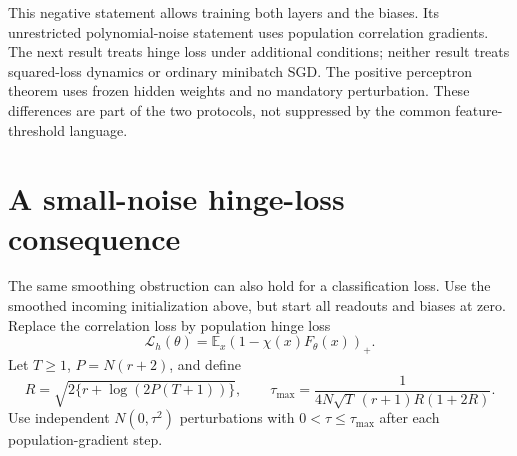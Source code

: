 \documentclass[11pt]{article}
\newcommand{\E}{\mathbb E}\newcommand{\R}{\mathbb R}
\begin{document}
This negative statement allows training both layers and the biases.
Its unrestricted polynomial-noise statement uses population correlation
gradients. The next result treats hinge loss under additional conditions;
neither result treats squared-loss dynamics or ordinary minibatch SGD.
The positive perceptron theorem uses frozen hidden weights and no
mandatory perturbation. These differences are part of the two protocols,
not suppressed by the common feature-threshold language.

\section{A small-noise hinge-loss consequence}
The same smoothing obstruction can also hold for a classification loss.
Use the smoothed incoming initialization above, but start all readouts
and biases at zero. Replace the correlation loss by population hinge loss
\[
              \mathcal L_h(\theta)=\E_x(1-\chi(x)F_\theta(x))_+.
\]
Let $T\ge1$, $P=N(r+2)$, and define
\[
 R=\sqrt{2\{r+\log(2P(T+1))\}},\qquad
 \tau_{\max}=\frac1{4N\sqrt T\,(r+1)R(1+2R)}.
 \tag{18b}
\]
Use independent $N(0,\tau^2)$ perturbations with
$0<\tau\le\tau_{\max}$ after each population-gradient step.
\end{document}
